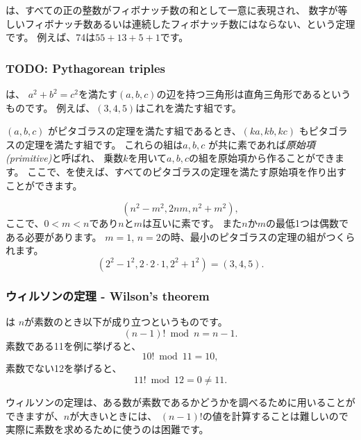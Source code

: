 
は、すべての正の整数がフィボナッチ数の和として一意に表現され、
数字が等しいフィボナッチ数あるいは連続したフィボナッチ数にはならない、という定理です。
例えば、74は$55+13+5+1$です。

\subsubsection{TODO: Pythagorean triples}


は、
$a^2+b^2=c^2$を満たす$(a,b,c)$の辺を持つ三角形は直角三角形であるというものです。
例えば、$(3,4,5)$はこれを満たす組です。

$(a, b, c)$ がピタゴラスの定理を満たす組であるとき、$(ka, kb, kc)$ もピタゴラスの定理を満たす組です。
これらの組は$a, b, c$ が共に素であれば\emph{原始項(primitive)}と呼ばれ、
乗数$k$を用いて$a,b,c$の組を原始項から作ることができます。
ここで、を使えば、すべてのピタゴラスの定理を満たす原始項を作り出すことができます。

\[(n^2-m^2,2nm,n^2+m^2),\]
ここで、$0<m<n$であり$n$と$m$は互いに素です。
また$n$か$m$の最低1つは偶数である必要があります。
$m = 1$, $n = 2$の時、最小のピタゴラスの定理の組がつくられます。
\[(2^2-1^2,2\cdot2\cdot1,2^2+1^2)=(3,4,5).\]

\subsubsection{ウィルソンの定理 - Wilson's theorem}


は
$n$が素数のとき以下が成り立つというものです。
\[(n-1)! \bmod n = n-1.\]
素数である11を例に挙げると、
\[10! \bmod 11 = 10,\]
素数でない12を挙げると、
\[11! \bmod 12 = 0 \neq 11.\]

ウィルソンの定理は、ある数が素数であるかどうかを調べるために用いることができますが、$n$が大きいときには、
$(n - 1) !$の値を計算することは難しいので実際に素数を求めるために使うのは困難です。
